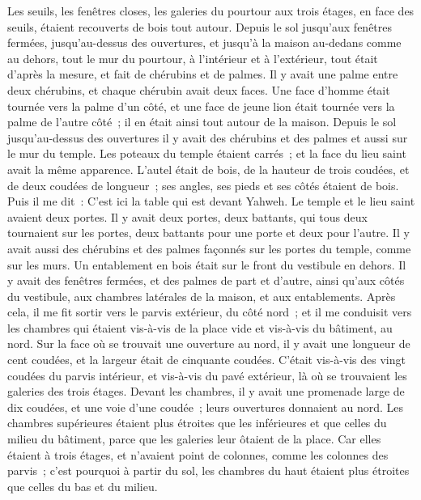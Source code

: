 \begin{multicols}{2}
Les seuils, les fenêtres closes, les galeries du pourtour aux trois étages, en face des seuils, étaient recouverts de bois tout autour. Depuis le sol jusqu'aux fenêtres fermées,
jusqu'au-dessus des ouvertures, et jusqu'à la maison au-dedans comme au dehors, tout le mur du pourtour, à l'intérieur et à l'extérieur, tout était d'après la mesure,
et fait de chérubins et de palmes. Il y avait une palme entre deux chérubins, et chaque chérubin avait deux faces.
Une face d'homme était tournée vers la palme d'un côté, et une face de jeune lion était tournée vers la palme de l'autre côté~; il en était ainsi tout autour de la maison.
Depuis le sol jusqu'au-dessus des ouvertures il y avait des chérubins et des palmes et aussi sur le mur du temple.
Les poteaux du temple étaient carrés~; et la face du lieu saint avait la même apparence.
L'autel était de bois, de la hauteur de trois coudées, et de deux coudées de longueur~; ses angles, ses pieds et ses côtés étaient de bois. Puis il me dit~: C'est ici la table qui est devant Yahweh.
Le temple et le lieu saint avaient deux portes.
Il y avait deux portes, deux battants, qui tous deux tournaient sur les portes, deux battants pour une porte et deux pour l'autre.
Il y avait aussi des chérubins et des palmes façonnés sur les portes du temple, comme sur les murs. Un entablement en bois était sur le front du vestibule en dehors.
Il y avait des fenêtres fermées, et des palmes de part et d'autre, ainsi qu'aux côtés du vestibule, aux chambres latérales de la maison, et aux entablements.
\VerseOne{}Après cela, il me fit sortir vers le parvis extérieur, du côté nord~; et il me conduisit vers les chambres qui étaient vis-à-vis de la place vide et vis-à-vis du bâtiment, au nord.
Sur la face où se trouvait une ouverture au nord, il y avait une longueur de cent coudées, et la largeur était de cinquante coudées.
C'était vis-à-vis des vingt coudées du parvis intérieur, et vis-à-vis du pavé extérieur, là où se trouvaient les galeries des trois étages.
Devant les chambres, il y avait une promenade large de dix coudées, et une voie d'une coudée~; leurs ouvertures donnaient au nord.
Les chambres supérieures étaient plus étroites que les inférieures et que celles du milieu du bâtiment, parce que les galeries leur ôtaient de la place.
Car elles étaient à trois étages, et n'avaient point de colonnes, comme les colonnes des parvis~; c'est pourquoi à partir du sol, les chambres du haut étaient plus étroites que celles du bas et du milieu.

\end{multicols}
